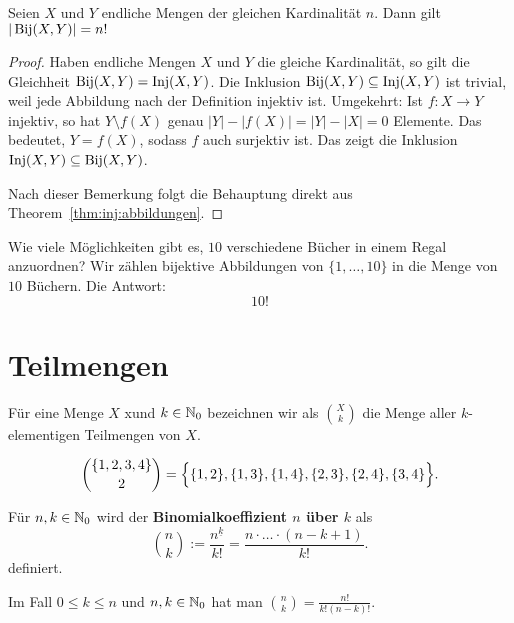 \begin{kor}
	 Seien $X$ und $Y$ endliche Mengen der gleichen Kardinalität $n$. Dann gilt $|\operatorname{Bij}(X,Y)| = n!$
\end{kor} 
\begin{proof}
	Haben endliche Mengen $X$ und $Y$ die gleiche Kardinalität, so gilt die Gleichheit $\operatorname{Bij}(X,Y ) = \operatorname{Inj}(X,Y)$. Die Inklusion $\operatorname{Bij}(X,Y ) \subseteq \operatorname{Inj}(X,Y)$ ist trivial, weil jede Abbildung nach der Definition injektiv ist. Umgekehrt: Ist $f: X \to Y$ injektiv, so hat $Y \setminus f(X)$ genau $|Y| - |f(X)| = |Y| - |X| =0$ Elemente. Das bedeutet, $Y = f(X)$, sodass $f$ auch surjektiv ist. Das zeigt die Inklusion $\operatorname{Inj}(X,Y) \subseteq \operatorname{Bij}(X,Y)$. 
	
	Nach dieser Bemerkung folgt die Behauptung direkt aus Theorem~\ref{thm:inj:abbildungen}. 
\end{proof} 

\begin{bsp}
	Wie viele Möglichkeiten gibt es, $10$ verschiedene Bücher in einem Regal anzuordnen? Wir zählen bijektive Abbildungen von $\{1,\ldots,10\}$ in die Menge von $10$ Büchern. Die Antwort: 
	\[
			10!
	\]
\end{bsp} 

\section{Teilmengen} 

\begin{defn}
Für eine Menge $X$ xund $k \in \mathbb{N}_0$ bezeichnen wir als $\binom{X}{k}$ die Menge aller $k$-elementigen Teilmengen von $X$. 
\end{defn}

\begin{bsp}
	\[
	\binom{\{1,2,3,4\}}{2} = \Bigl\{ \{1,2\},\{1,3\}, \{1,4\}, \{2,3\}, \{2,4\} ,\{3,4\} \Bigr\}.
	\]
\end{bsp} 


\begin{defn}
	Für $n,k \in \mathbb{N}_0$ wird der \textbf{Binomialkoeffizient  $n$ über $k$} als 
	\[
		\binom{n}{k}:= \frac{n^{\underline{k}}}{k!}  = \frac{n \cdot \ldots \cdot (n-k+1)}{k!}.
	\]
	definiert. 
\end{defn} 

\begin{bem}
	Im Fall $0 \le k \le n$ und $n,k \in \mathbb{N}_0$ hat man $\binom{n}{k} = \frac{n!}{k! (n-k)!}$. 
\end{bem} 


